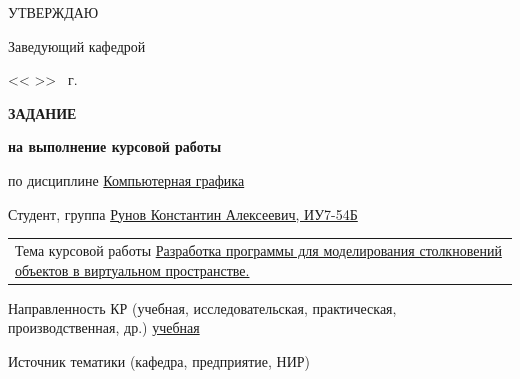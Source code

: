 \fontsize{11pt}{11pt}\selectfont
\begin{flushright}
    \begin{minipage}{0.4\textwidth}\raggedleft

        УТВЕРЖДАЮ \hspace{2.5cm}

        Заведующий кафедрой~


        \ulinetext{}{} 


        << \ulinetext[1cm]{}{} >> \ulinetext{}{} \the\year \ г.
    \end{minipage}
\end{flushright}

\begin{center}\linespread{1}\selectfont
    \Large{\textbf{ЗАДАНИЕ}}

    \large{\textbf{на выполнение курсовой работы}}
\end{center}

\noindent по дисциплине \uline{\hspace{1cm} Компьютерная графика \hfill}

\noindent Студент, группа \uline{\hspace{1cm} Рунов Константин Алексеевич, ИУ7-54Б \hfill}




\noindent \begin{tabularx}{\linewidth}{@{}X@{}}
Тема курсовой работы \uline{
    Разработка программы для моделирования столкновений объектов в виртуальном пространстве.
    \hfill
    }
\end{tabularx}



\noindent Направленность КР (учебная, исследовательская, практическая, производственная, др.)
\noindent \uline{\hfill учебная \hfill}

\noindent Источник тематики (кафедра, предприятие, НИР)
\noindent {}

